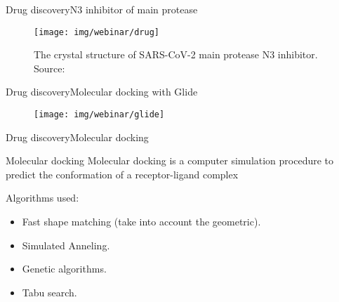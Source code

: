\documentclass[10pt]{beamer}
\newcommand{\1}{
        	\setbeamertemplate{background}{
        		\texttt{[image: img/1]}
        		\tikz[overlay] \fill[fill opacity=0.75,fill=white] (0,0) rectangle (-\paperwidth,\paperheight);
        	}
}
\begin{document}
\begin{frame}{Drug discovery}{N3 inhibitor of main protease}
	\begin{figure}[]
		\centering
		\texttt{[image: img/webinar/drug]}
		\label{img:mot2}
		\caption{The crystal structure of SARS-CoV-2 main protease N3 inhibitor. Source: \cite{jin2020structure}}
	\end{figure}
\end{frame}

\begin{frame}{Drug discovery}{Molecular docking with Glide}
	\begin{figure}[]
		\centering
		\texttt{[image: img/webinar/glide]}
		\label{img:mot2}
	\end{figure}
\end{frame}

\begin{frame}{Drug discovery}{Molecular docking}
	\begin{block}{Molecular docking}
		Molecular docking is a computer simulation procedure to
		predict the conformation of a receptor-ligand complex \cite{dias2008molecular}
	\end{block}

	\begin{block}{}
		Algorithms used:
		\begin{itemize}
			\item Fast shape matching (take into account the geometric).
			\item Simulated Anneling.
			\item Genetic algorithms.
			\item Tabu search.
		\end{itemize}
	\end{block}
\end{frame}
\end{document}
